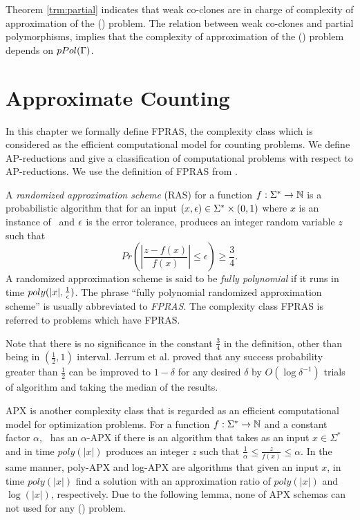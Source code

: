 Theorem \ref{trm:partial} indicates that weak co-clones are
in charge of complexity of approximation of the \ccsp(\mrelset) problem.
The relation between weak co-clones and partial polymorphisms,
implies that the complexity of approximation of the \ccsp(\mrelset) problem 
depends on \(pPol(\Gamma)\)\@.

\chapter{Approximate Counting}
In this chapter we formally define FPRAS, the complexity class which
is considered as the efficient computational model for counting problems.
We define AP-reductions and give a classification of computational problems 
with respect to AP-reductions. We use the definition of FPRAS from \cite{counting}\@. 

A \emph{randomized approximation scheme} (RAS) for a function \(f:\Sigma^*\to\mathbb{N}\)
is a probabilistic algorithm that for an input \((x,\epsilon)\in\Sigma^*\times(0,1)\) 
where \(x\) is an instance of \mf\ and \(\epsilon\) is the error tolerance, 
produces an integer random variable \(z\) such that 
\[Pr\left(\left|\frac{z-f(x)}{f(x)}\right|\le \epsilon\right) \ge \frac{3}{4}.\]
A randomized approximation scheme is said to be \emph{fully polynomial} if it runs in time \(poly(|x|,\frac{1}{\epsilon})\)\@. 
The phrase ``fully polynomial randomized approximation scheme'' is usually abbreviated to 
\emph{FPRAS}\@. The complexity class FPRAS is referred to problems which have FPRAS\@.

Note that there is no significance in the constant \(\frac{3}{4}\) in the definition,
other than being in \((\frac{1}{2},1)\) interval. 
Jerrum et al. \cite{JVV} proved that any success probability 
greater than \(\frac{1}{2}\) can be improved to \(1-\delta\) for any desired \(\delta\) by
\(O(\log \delta^{-1})\) trials of algorithm and taking the median of the results.

APX is another complexity class that is regarded as an efficient computational model for
optimization problems.
For a function \(f:\Sigma^*\to\mathbb{N}\) and a constant factor \(\alpha\),
\mf\ has an \(\alpha\)-APX if there is an algorithm that
takes as an input \(x\in\Sigma^*\) and in time \(poly(|x|)\) produces an integer \(z\)
such that \(\frac{1}{\alpha}\le\frac{z}{f(x)}\le \alpha\). In the same manner,
poly-APX and log-APX are algorithms that given an input
\(x\), in time \(poly(|x|)\) find a solution with an approximation ratio of \(poly(|x|)\)
and \(\log(|x|)\), respectively. Due to the following lemma, none of APX schemas can not
used for any \ccsp(\mrelset) problem.

